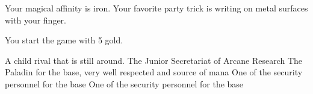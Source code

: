 \documentclass[char]{guildcamp3}
\begin{document}
\begin{itemz}[Notes]
	\item Your magical affinity is iron. Your favorite party trick is writing on metal surfaces with your finger.
	\item You start the game with 5 gold. 
\end{itemz}

\begin{contacts}
  \contact{\cMageTwo{}} A child rival that is still around.
  \contact{\cNobleTwo{}} The Junior Secretariat of Arcane Research
  \contact{\cPaladin{}} The Paladin for the base, very well respected and source of mana 
  \contact{\cRogueOne{}} One of the security personnel for the base
  \contact{\cRogueTwo{}} One of the security personnel for the base
\end{contacts}
\end{document}
